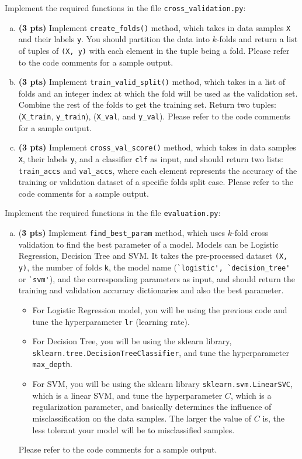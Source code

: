 \documentclass{article}
\begin{document}
Implement the required functions in the file \verb|cross_validation.py|:
\begin{enumerate}[(a)]
    \item \textbf{(3 pts)} Implement \verb|create_folds()| method, which takes in data samples \verb|X| and their labels \verb|y|. You should partition the data into $k$-folds and return a list of tuples of \verb|(X, y)| with each element in the tuple being a fold. Please refer to the code comments for a sample output.
    \item \textbf{(3 pts)} Implement \verb|train_valid_split()| method, which takes in a list of folds and an integer index at which the fold will be used as the validation set. Combine the rest of the folds to get the training set. Return two tuples: (\verb|X_train|, \verb|y_train|), (\verb|X_val|, and \verb|y_val|). Please refer to the code comments for a sample output.
    \item \textbf{(3 pts)} Implement \verb|cross_val_score()| method, which takes in data samples \verb|X|, their labels \verb|y|, and a classifier \verb|clf| as input, and should return two lists: \verb|train_accs| and \verb|val_accs|, where each element represents the accuracy of the training or validation dataset of a specific folds split case. Please refer to the code comments for a sample output.
\end{enumerate}
Implement the required functions in the file \verb|evaluation.py|:
\begin{enumerate}[(a)]\addtocounter{enumi}{3}
    \item {(\bf 3 pts)} Implement \verb|find_best_param| method, which uses $k$-fold cross validation to find the best parameter of a model. Models can be Logistic Regression, Decision Tree and SVM. It takes the pre-processed dataset \verb|(X, y)|, the number of folds \verb|k|, the model name (\verb|`logistic', `decision_tree'| or \verb|`svm'|), and the corresponding parameters as input, and should return the training and validation accuracy dictionaries and also the best parameter.
    \begin{itemize}
        \item For Logistic Regression model, you will be using the previous code and tune the hyperparameter \verb|lr| (learning rate).
        \item For Decision Tree, you will be using the sklearn library, \verb|sklearn.tree.DecisionTreeClassifier|, and tune the hyperparameter \verb|max_depth|.
        \item For SVM, you will be using the sklearn library \verb|sklearn.svm.LinearSVC|, which is a linear SVM, and tune the hyperparameter $C$, which is a regularization parameter, and basically determines the influence of misclassification on the data samples. The larger the value of $C$ is, the less tolerant your model will be to misclassified samples.
    \end{itemize}
Please refer to the code comments for a sample output.
\end{enumerate}
\end{document}
